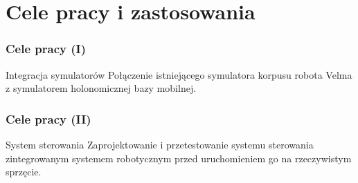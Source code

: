 \section{Cele pracy i zastosowania}

\begin{frame}
\frametitle{Cele pracy (I)}
\begin{block}{Integracja symulatorów}
Połączenie istniejącego symulatora korpusu robota Velma z symulatorem holonomicznej bazy mobilnej.
\end{block}
\end{frame}


\begin{frame}
\frametitle{Cele pracy (II)}
\begin{block}{System sterowania}
Zaprojektowanie i przetestowanie systemu sterowania zintegrowanym systemem robotycznym przed uruchomieniem go na rzeczywistym sprzęcie.
\end{block}
\end{frame}

